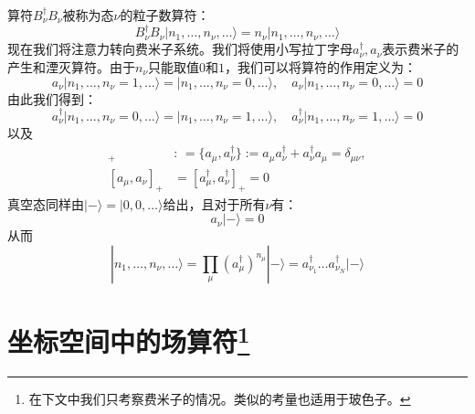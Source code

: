 算符$B^{\dagger}_{\nu}B_{\nu}$被称为态$\nu$的粒子数算符：
\begin{equation}
B^{\dagger}_{\nu}B_{\nu}|n_{1},\dots,n_{\nu},\dots\rangle=n_{\nu}|n_{1},\dots,n_{\nu},\dots\rangle\label{eq:appendix_c_boson_number_op}
\end{equation}
现在我们将注意力转向费米子系统。我们将使用小写拉丁字母$a^{\dagger}_{\nu},a_{\nu}$表示费米子的产生和湮灭算符。由于$n_{\nu}$只能取值$0$和$1$，我们可以将算符的作用定义为：
\begin{equation}
a_{\nu}|n_{1},\dots,n_{\nu}=1,\dots\rangle=|n_{1},\dots,n_{\nu}=0,\dots\rangle,\quad a_{\nu}|n_{1},\dots,n_{\nu}=0,\dots\rangle=0\label{eq:appendix_c_fermion_annihilation}
\end{equation}
由此我们得到：
\begin{equation}
a^{\dagger}_{\nu}|n_{1},\dots,n_{\nu}=0,\dots\rangle=|n_{1},\dots,n_{\nu}=1,\dots\rangle,\quad a^{\dagger}_{\nu}|n_{1},\dots,n_{\nu}=1,\dots\rangle=0\label{eq:appendix_c_fermion_creation}
\end{equation}
以及
\begin{align}
[a_{\mu},a^{\dagger}_{\nu}]_{+} & :\,=\{a_{\mu},a^{\dagger}_{\nu}\}:=a_{\mu}a^{\dagger}_{\nu}+a^{\dagger}_{\nu}a_{\mu}=\delta_{\mu\nu},\nonumber \\{}
[a_{\mu},a_{\nu}]_{+} & =[a^{\dagger}_{\mu},a^{\dagger}_{\nu}]_{+}=0\label{eq:appendix_c_fermion_anticommutators}
\end{align}
真空态同样由$|-\rangle=|0,0,\dots\rangle$给出，且对于所有$\nu$有：
\begin{equation}
a_{\nu}|-\rangle=0\label{eq:appendix_c_fermion_vacuum}
\end{equation}
从而
\begin{equation}
|n_{1},\dots,n_{\nu},\dots\rangle=\prod_{\mu}(a^{\dagger}_{\mu})^{n_{\mu}}|-\rangle=a^{\dagger}_{\nu_{1}}\dots a^{\dagger}_{\nu_{N}}|-\rangle\label{eq:appendix_c_fermion_state_creation}
\end{equation}


\section{坐标空间中的场算符\protect\footnote{在下文中我们只考察费米子的情况。类似的考量也适用于玻色子。}}

